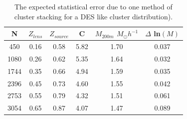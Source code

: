 \begin{table}
        \centering
        \begin{tabular}{|c|c|c|c|c|c|}  
          \hline
          N  &  $Z_{lens}$ & $Z_{source}$  & C & $M_{200m}$ $ M_\odot
          h^{-1}$  & $\Delta$ ln$(M)$ \\ 
          \hline
          450  & 0.16  & 0.58  & 5.82  & 1.70  & 0.037   \\
          \hline
          1080  & 0.26  & 0.62  & 5.35  & 1.64  & 0.032   \\
          \hline
          1744  & 0.35  & 0.66  & 4.94  & 1.59  & 0.035 \\
          \hline   
          2396  & 0.45  & 0.73  & 4.60  & 1.55  & 0.042   \\
          \hline
          2753  & 0.55  & 0.79  & 4.32  & 1.51  & 0.061   \\
          \hline
          3054  & 0.65  & 0.87  & 4.07  & 1.47  & 0.089   \\         
          \hline
        \end{tabular}
        \caption{ The expected statistical error due to one method of
          cluster stacking for a DES like cluster distribution).}
    \label{table:NFW_1_b}
\end{table}
